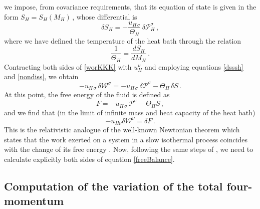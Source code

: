 \documentclass[preprints,article,accept,moreauthors,pdftex]{mdpi}
\begin{document}
we impose, from covariance requirements, that its equation of state is given in the form
$ S_H =S_H(M_H) \,$, whose differential is
\begin{equation}\label{dsssh}
\delta S_H = - \dfrac{u_{H\, \sigma}}{\Theta_H} \, \delta \mathcal{P}_H^\sigma \, ,
\end{equation}
where we have defined the temperature of the heat bath through the relation
\begin{equation}
\dfrac{1}{\Theta_H} = \dfrac{dS_H}{dM_H} \, .
\end{equation}
Contracting both sides of \eqref{worKKK} with $u_H^\nu$ and employing equations \eqref{dsssh} and \eqref{nondiss}, we obtain
\begin{equation}
-u_{H \, \sigma} \, \delta \mathcal{W}^\sigma = 
-u_{H\, \sigma} \, \delta \mathcal{P}^\sigma - \Theta_H \, \delta S \, .
\end{equation}
At this point, the free energy of the fluid is defined as
\begin{equation}
F = -u_{H \, \sigma} \,  \mathcal{P}^\sigma - \Theta_H  S \, ,
\end{equation}
and we find that (in the limit of infinite mass and heat capacity of the heat bath)
\begin{equation}\label{freeBalance}
-u_{H\nu} \delta \mathcal{W}^\nu = \delta F \, .
\end{equation}
This is the relativistic analogue of the well-known Newtonian theorem which states that the work exerted on a system in a slow isothermal process coincides with the change of its free energy \cite{GavassinoTermometri}. Now, following the same steps of \citet{Wexler1997}, we need to calculate explicitly both sides of equation \eqref{freeBalance}. 

\subsection{Computation of the variation of the total four-momentum}
\end{document}
